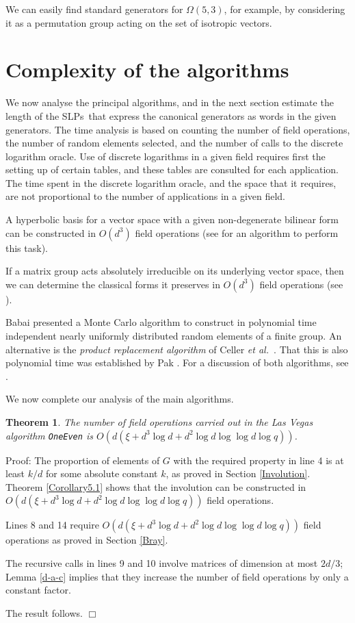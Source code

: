 \documentclass[12pt]{article}
\newtheorem{theorem}[definition]{Theorem}
\newenvironment{proof}{\normalsize {\sc Proof}:}{{\hfill $\Box$ \\}}
\def\Oh{O}  %
\def\SLPs{{\rm SLPs}}
\begin{document}
We can easily find standard generators for $\Omega(5, 3)$, 
for example, by considering
it as a permutation group acting on the set of isotropic vectors.

\section{Complexity of the algorithms} 
\label{Analysis}
We now analyse the principal
algorithms, and in the next section estimate the length of the \SLPs\ 
that express the canonical generators as words in  the given
generators. The time analysis is based on counting the number of
field operations, the number of random elements selected, and 
the number of calls to the discrete logarithm oracle. Use of discrete
logarithms in a given field requires first the setting up of certain
tables, and these tables are consulted for each application. The
time spent in the discrete logarithm oracle, and the space that it
requires, are not proportional to the number of applications in a
given field. 

A hyperbolic basis for a vector space with a given
non-degenerate bilinear form can be constructed 
in $\Oh(d^3)$ field operations (see \cite{Brooksbank03} 
for an algorithm to perform this task).

If a matrix group acts absolutely irreducible  on its underlying 
vector space, then we can determine the classical forms 
it preserves in $\Oh(d^3)$ field operations 
(see \cite[Section 7.5.4]{HoltEickOBrien05}).

Babai \cite{Babai91} presented a Monte Carlo algorithm to
construct in polynomial time independent nearly uniformly distributed 
random elements of a finite group.  An alternative is the 
{\it product replacement algorithm} of Celler
{\it et al.\ }\cite{Celleretal95}.
That this is also polynomial time was
established by Pak \cite{Pak00}.
For a discussion of both algorithms, see \cite[pp.\ 26-30]{Seress03}.

We now complete our analysis of the main algorithms.
\begin{theorem}\label{Theorem1}  
The number of field operations carried out in the 
Las Vegas algorithm {\tt OneEven} is 
$\Oh(d (\xi + d^3 \log d + d^2\log d \log\log d \log q))$. 
\end{theorem}
\begin{proof} 
The proportion of elements of $G$ with the required property in line 4
is at least $k/d$ for some absolute constant $k$, as proved in Section
\ref{Involution}. Theorem \ref{Corollary5.1} shows that the 
involution can be constructed in 
$\Oh(d(\xi + d^3 \log d + d^2 \log d \log\log d \log q))$ field operations.

Lines 8 and 14 require 
$\Oh(d(\xi + d^3 \log d + d^2 \log d \log\log d \log q))$ field operations
as proved in Section \ref{Bray}.

The recursive calls in  lines 9 and 10 involve matrices of dimension at
most $2d/3$; Lemma \ref{d-a-c} implies that they increase 
the number of field operations by only a constant factor. 

The result follows.
\end{proof}
\end{document}
